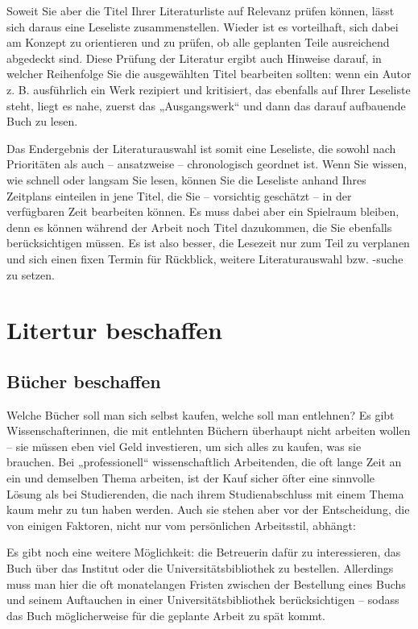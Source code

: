 \documentclass[]{book}
\theoremstyle{definition}
\theoremstyle{definition}
\theoremstyle{definition}
\theoremstyle{remark}
\begin{document}
Soweit Sie aber die Titel Ihrer Literaturliste auf Relevanz prüfen
können, lässt sich daraus eine Leseliste zusammenstellen. Wieder ist es
vorteilhaft, sich dabei am Konzept zu orientieren und zu prüfen, ob alle
geplanten Teile ausreichend abgedeckt sind. Diese Prüfung der Literatur
ergibt auch Hinweise darauf, in welcher Reihenfolge Sie die ausgewählten
Titel bearbeiten sollten: wenn ein Autor z. B. ausführlich ein Werk
rezipiert und kritisiert, das ebenfalls auf Ihrer Leseliste steht, liegt
es nahe, zuerst das „Ausgangswerk`` und dann das darauf aufbauende Buch
zu lesen.

Das Endergebnis der Literaturauswahl ist somit eine Leseliste, die
sowohl nach Prioritäten als auch -- ansatzweise -- chronologisch
geordnet ist. Wenn Sie wissen, wie schnell oder langsam Sie lesen,
können Sie die Leseliste anhand Ihres Zeitplans einteilen in jene Titel,
die Sie -- vorsichtig geschätzt -- in der verfügbaren Zeit bearbeiten
können. Es muss dabei aber ein Spielraum bleiben, denn es können während
der Arbeit noch Titel dazukommen, die Sie ebenfalls berücksichtigen
müssen. Es ist also besser, die Lesezeit nur zum Teil zu verplanen und
sich einen fixen Termin für Rückblick, weitere Literaturauswahl bzw.
-suche zu setzen.

\section{Litertur beschaffen}\label{litertur-beschaffen}

\subsection{Bücher beschaffen}\label{bucher-beschaffen}

Welche Bücher soll man sich selbst kaufen, welche soll man entlehnen? Es
gibt Wissenschafterinnen, die mit entlehnten Büchern überhaupt nicht
arbeiten wollen -- sie müssen eben viel Geld investieren, um sich alles
zu kaufen, was sie brauchen. Bei „professionell`` wissenschaftlich
Arbeitenden, die oft lange Zeit an ein und demselben Thema arbeiten, ist
der Kauf sicher öfter eine sinnvolle Lösung als bei Studierenden, die
nach ihrem Studienabschluss mit einem Thema kaum mehr zu tun haben
werden. Auch sie stehen aber vor der Entscheidung, die von einigen
Faktoren, nicht nur vom persönlichen Arbeitsstil, abhängt:

Es gibt noch eine weitere Möglichkeit: die Betreuerin dafür zu
interessieren, das Buch über das Institut oder die
Universitätsbibliothek zu bestellen. Allerdings muss man hier die oft
monatelangen Fristen zwischen der Bestellung eines Buchs und seinem
Auftauchen in einer Universitätsbibliothek berücksichtigen -- sodass das
Buch möglicherweise für die geplante Arbeit zu spät kommt.
\end{document}
